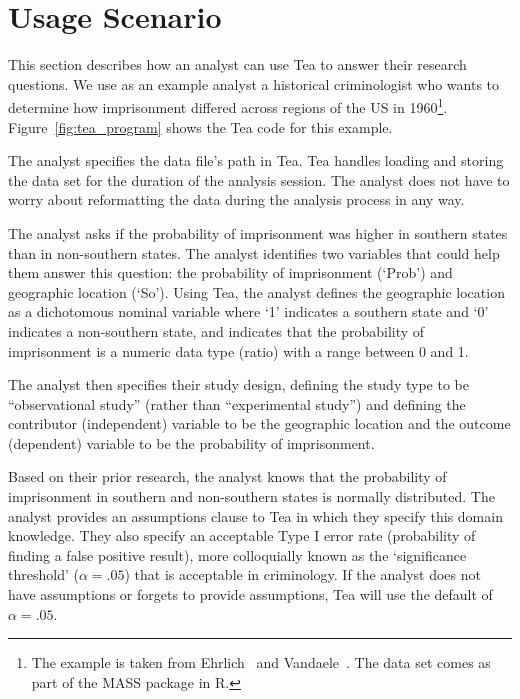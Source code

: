 \section{Usage Scenario}\label{usageScenarioTea}
\figureTeaProgram

This section describes how an analyst can use Tea to answer their research
questions. We use as an example analyst a historical criminologist who wants to
determine how imprisonment differed across regions of the US in
1960\footnote{The example is taken from Ehrlich~\cite{ehrlich1973participation}
and Vandaele~\cite{vandaele1987participation}. The data set comes as part of the
MASS package in R.}. Figure~\ref{fig:tea_program} shows the Tea code for this
example.

The analyst specifies the data file's path in Tea. Tea handles loading and
storing the data set for the duration of the analysis session. The analyst does
not have to worry about reformatting the data during the analysis process in any way.

The analyst asks if the probability of imprisonment was higher in
southern states than in non-southern states. The analyst identifies
two variables that could help them answer this question: the
probability of imprisonment (`Prob') and geographic location
(`So'). %
Using Tea, the analyst defines the geographic
location as a dichotomous nominal variable where `1' indicates a
southern state and `0' indicates a non-southern state, and indicates that the
probability of imprisonment is a numeric data type (ratio) with a
range between 0 and 1. %

The analyst then specifies their study design, defining the study type
to be ``observational study'' (rather than ``experimental study'') and
defining the contributor (independent) variable to be the geographic location and
the outcome (dependent) variable to be the probability of
imprisonment.

Based on their prior research, the analyst knows that the probability
of imprisonment in southern and non-southern states is normally
distributed. The analyst provides an assumptions clause to Tea in
which they specify this domain knowledge. They also specify an
acceptable Type I error rate (probability of finding a false positive
result), more colloquially known as the `significance threshold'
($\alpha = .05$) that is acceptable in criminology. If the analyst
does not have assumptions or forgets to provide assumptions, Tea will
use the default of $\alpha = .05$.

